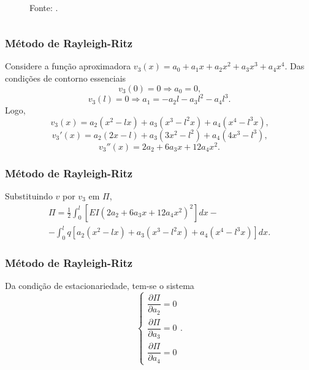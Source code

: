 \documentclass{beamer}
\newcommand{\fonte}[1]{
	\begin{center}
		\footnotesize Fonte: #1
	\end{center}
}
\begin{document}
{\begin{frame}
\begin{itemize}
\begin{columns}
\begin{column}{0.5\textwidth}
\begin{figure}[h]
{
						}
						\\
						\fonte{.}
					\end{figure}
				\end{column}
			\end{columns}
		\end{itemize}
	\end{frame}
	}
	
	\begin{frame}
		\frametitle{Método de Rayleigh-Ritz}
		\justify
		
		Considere a função aproximadora $v_3(x)=a_0 + a_1 x + a_2 x^2 + a_3 x^3 + a_4 x^4$. \pause Das condições de contorno essenciais
		$$
			v_3(0)=0\Longrightarrow a_0 = 0\text{,}
		$$
		\pause
		$$
			v_3(l)=0\Longrightarrow a_1 = -a_2l - a_3l^2 - a_4l^3\text{.}
		$$
		\pause
		Logo, 
		$$v_3(x)=a_2(x^2-lx)+a_3(x^3-l^2x) + a_4(x^4-l^3x)\text{,}$$
		\pause 
		$$v_3'(x)=a_2(2x-l)+a_3(3x^2-l^2)+a_4(4x^3-l^3)\text{,}$$
		\pause
		$$v_3''(x)=2a_2 + 6a_3x + 12a_4x^2\text{.}$$
	\end{frame}
	
	\begin{frame}
		\frametitle{Método de Rayleigh-Ritz}
		\justify
		
		Substituindo $v$ por $v_3$ em $\Pi$,
		\begin{multline*}
			\Pi = \frac{1}{2} \int_0^l \left [
				EI(2a_2+6a_3x+12a_4x^2)^2
			\right ] dx
			-
			\\
			-
			\int_0^l q \left [
				a_2(x^2 - lx)
				+
				a_3(x^3 - l^2x)
				+
				a_4(x^4 - l^3x)
			\right ] dx
			\text{.}
		\end{multline*}
	\end{frame}
	
	\begin{frame}
		\frametitle{Método de Rayleigh-Ritz}
		\justify
		Da condição de estacionariedade, tem-se o sistema
		$$
			\begin{cases}
				\dfrac{\partial \Pi}{\partial a_2}=0\\[10pt]
				\dfrac{\partial \Pi}{\partial a_3}=0\\[10pt]
				\dfrac{\partial \Pi}{\partial a_4}=0
			\end{cases}
			\text{.}
		$$
	\end{frame}
	
\end{document}
